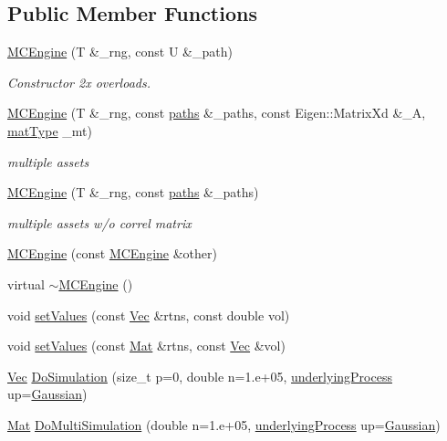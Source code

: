 \subsection*{Public Member Functions}
\begin{DoxyCompactItemize}
\item 
\hyperlink{classMCEngine_a2021419bc32829220a41a42e0b7ddca3}{M\+C\+Engine} (T \&\+\_\+rng, const U \&\+\_\+path)
\begin{DoxyCompactList}\small\item\em Constructor 2x overloads. \end{DoxyCompactList}\item 
\hyperlink{classMCEngine_a1d6bcdacaa99b8f75a89c9b2c344bd0d}{M\+C\+Engine} (T \&\+\_\+rng, const \hyperlink{classMCEngine_a977f1048508a1467c496c2c47231d1d3}{paths} \&\+\_\+paths, const Eigen\+::\+Matrix\+Xd \&\+\_\+A, \hyperlink{mc__engine_8h_aac1fa89c4c60883790b2adb885048486}{mat\+Type} \+\_\+mt)
\begin{DoxyCompactList}\small\item\em multiple assets \end{DoxyCompactList}\item 
\hyperlink{classMCEngine_a51e0bc14bc95f352654e7caaad78ecfb}{M\+C\+Engine} (T \&\+\_\+rng, const \hyperlink{classMCEngine_a977f1048508a1467c496c2c47231d1d3}{paths} \&\+\_\+paths)
\begin{DoxyCompactList}\small\item\em multiple assets w/o correl matrix \end{DoxyCompactList}\item 
\hyperlink{classMCEngine_a2341fbbbe2e92f91e4672757a1f8fea3}{M\+C\+Engine} (const \hyperlink{classMCEngine}{M\+C\+Engine} \&other)
\item 
virtual \hyperlink{classMCEngine_a9e6d34c928e8a7c7fd3cf25efc18a56a}{$\sim$\+M\+C\+Engine} ()
\item 
void \hyperlink{classMCEngine_a28f2f449e07eb22e0ae9caadfc919a3e}{set\+Values} (const \hyperlink{compute__returns__eigen_8h_a1eb6a9306ef406d7975f3cbf2e247777}{Vec} \&rtns, const double vol)
\item 
void \hyperlink{classMCEngine_ab95a4a68842966a18f2bc8ef74dabf1f}{set\+Values} (const \hyperlink{compute__returns__eigen_8h_ae14dd28696f743e067dbd2594616bad6}{Mat} \&rtns, const \hyperlink{compute__returns__eigen_8h_a1eb6a9306ef406d7975f3cbf2e247777}{Vec} \&vol)
\item 
\hyperlink{compute__returns__eigen_8h_a1eb6a9306ef406d7975f3cbf2e247777}{Vec} \hyperlink{classMCEngine_a2e84a3728e2fcea5999c472077ddeb14}{Do\+Simulation} (size\+\_\+t p=0, double n=1.e+05, \hyperlink{mc__engine_8h_aeb3b337d49b67199ac031f705d206198}{underlying\+Process} up=\hyperlink{mc__engine_8h_aeb3b337d49b67199ac031f705d206198aa11844f44df96808eb4e519ba04f088c}{Gaussian})
\item 
\hyperlink{compute__returns__eigen_8h_ae14dd28696f743e067dbd2594616bad6}{Mat} \hyperlink{classMCEngine_a15873abff351cca971b1154f7ffe40b5}{Do\+Multi\+Simulation} (double n=1.e+05, \hyperlink{mc__engine_8h_aeb3b337d49b67199ac031f705d206198}{underlying\+Process} up=\hyperlink{mc__engine_8h_aeb3b337d49b67199ac031f705d206198aa11844f44df96808eb4e519ba04f088c}{Gaussian})
\end{DoxyCompactItemize}
